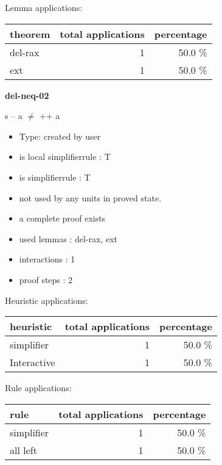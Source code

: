 \documentclass[a4paper]{article}
\begin{document}
Lemma applications:

\begin{supertabular}{l|r|r}
theorem	        & total applications & percentage \\ \hline
del-rax & 1 & 50.0 \% \\
ext & 1 & 50.0 \% \\

\end{supertabular}
\pagebreak

{\LARGE\bf del-neq-02}\label{lemma-del-neq-02}

\medskip

 \Fol s -- a $\neq$  ++ a

\begin{itemize}

\item Type: created by user

\item is local simplifierrule : T
\item is simplifierrule : T
\item not used by any units in proved state.
\item       a complete proof exists
\item       used lemmas  : del-rax, ext
\item       interactions : 1
\item       proof steps  : 2
\end{itemize}

\medskip


Heuristic applications:

\begin{supertabular}{l|r|r}
heuristic	& total applications & percentage \\ \hline
simplifier & 1 & 50.0 \% \\
Interactive & 1 & 50.0 \% \\

\end{supertabular}

Rule applications:

\begin{supertabular}{l|r|r}
rule	        & total applications & percentage \\ \hline
simplifier & 1 & 50.0 \% \\
all left & 1 & 50.0 \% \\

\end{supertabular}
\end{document}
